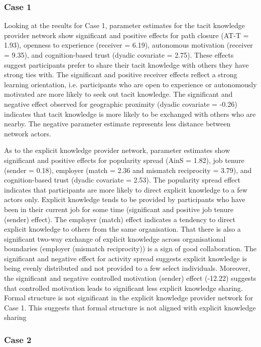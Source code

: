 \subsubsection{Case 1}

Looking at the results for Case 1, parameter estimates for the tacit knowledge provider network show significant and positive effects for path closure (AT-T = 1.93), openness to experience (receiver = 6.19), autonomous motivation (receiver = 9.35), and cognition-based trust (dyadic covariate = 2.75). These effects suggest participants prefer to share their tacit knowledge with others they have strong ties with. The significant and positive receiver effects reflect a strong learning orientation, i.e. participants who are open to experience or autonomously motivated are more likely to seek out tacit knowledge. The significant and negative effect observed for geographic proximity (dyadic covariate = -0.26) indicates that tacit knowledge is more likely to be exchanged with others who are nearby. The negative parameter estimate represents less distance between network actors. \medskip

As to the explicit knowledge provider network, parameter estimates show significant and positive effects for popularity spread (AinS = 1.82), job tenure (sender = 0.18), employer (match = 2.36 and mismatch reciprocity = 3.79), and cognition-based trust (dyadic covariate = 2.53). The popularity spread effect indicates that participants are more likely to direct explicit knowledge to a few actors only. Explicit knowledge tends to be provided by participants who have been in their current job for some time (significant and positive job tenure (sender) effect). The employer (match) effect indicates a tendency to direct explicit knowledge to others from the same organisation. That there is also a significant two-way exchange of explicit knowledge across organisational boundaries (employer (mismatch reciprocity)) is a sign of good collaboration. The significant and negative effect for activity spread suggests explicit knowledge is being evenly distributed and not provided to a few select individuals. Moreover, the significant and negative controlled motivation (sender) effect (-12.22) suggests that controlled motivation leads to significant less explicit knowledge sharing. Formal structure is not significant in the explicit knowledge provider network for Case 1. This suggests that formal structure is not aligned with explicit knowledge sharing

\subsubsection{Case 2}


